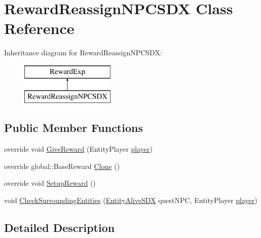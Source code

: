 \hypertarget{class_reward_reassign_n_p_c_s_d_x}{}\section{Reward\+Reassign\+N\+P\+C\+S\+DX Class Reference}
\label{class_reward_reassign_n_p_c_s_d_x}
Inheritance diagram for Reward\+Reassign\+N\+P\+C\+S\+DX\+:\begin{figure}[H]
\begin{center}
\leavevmode
\includegraphics[height=2.000000cm]{d9/d6a/class_reward_reassign_n_p_c_s_d_x}
\end{center}
\end{figure}
\subsection*{Public Member Functions}
\begin{DoxyCompactItemize}
\item 
override void \mbox{\hyperlink{class_reward_reassign_n_p_c_s_d_x_a8433652ccfadd1af0de4179945a86092}{Give\+Reward}} (Entity\+Player \mbox{\hyperlink{_sphere_i_i_01_music_01_boxes_2_config_2_localization_8txt_a4e2cb8aeff651600ea1cc57fe5a929a4}{player}})
\item 
override global\+::\+Base\+Reward \mbox{\hyperlink{class_reward_reassign_n_p_c_s_d_x_ab066d21f87e829a62a67da0d347b346c}{Clone}} ()
\item 
override void \mbox{\hyperlink{class_reward_reassign_n_p_c_s_d_x_ae7d0652d2c3443333ef0e7fbff2dd27c}{Setup\+Reward}} ()
\item 
void \mbox{\hyperlink{class_reward_reassign_n_p_c_s_d_x_a3b469f6ce06b7a05b7a680fabb8fe5ad}{Check\+Surrounding\+Entities}} (\mbox{\hyperlink{class_entity_alive_s_d_x}{Entity\+Alive\+S\+DX}} quest\+N\+PC, Entity\+Player \mbox{\hyperlink{_sphere_i_i_01_music_01_boxes_2_config_2_localization_8txt_a4e2cb8aeff651600ea1cc57fe5a929a4}{player}})
\end{DoxyCompactItemize}


\subsection{Detailed Description}


